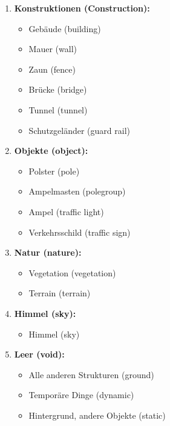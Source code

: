 \begin{enumerate}
\newpage
                \item \textbf{Konstruktionen (Construction):}
                \begin{itemize}
                    \item Gebäude (building)
                    \item Mauer (wall)
                    \item Zaun (fence)
                    \item Brücke (bridge)
                    \item Tunnel (tunnel)
                    \item Schutzgeländer (guard rail)
                \end{itemize}
                \item \textbf{Objekte (object):}
                \begin{itemize}
                    \item Polster (pole)
                    \item Ampelmasten (polegroup)
                    \item Ampel (traffic light)
                    \item Verkehrsschild (traffic sign)
                \end{itemize}
                \item \textbf{Natur (nature):}
                \begin{itemize}
                    \item Vegetation (vegetation)
                    \item Terrain (terrain)
                \end{itemize}
                \item \textbf{Himmel (sky):}
                \begin{itemize}
                    \item Himmel (sky)
                \end{itemize}
                \item \textbf{Leer (void):}
                \begin{itemize}
                    \item Alle anderen Strukturen (ground)
                    \item Temporäre Dinge (dynamic)
                    \item Hintergrund, andere Objekte (static)
                \end{itemize}
            \end{enumerate}

